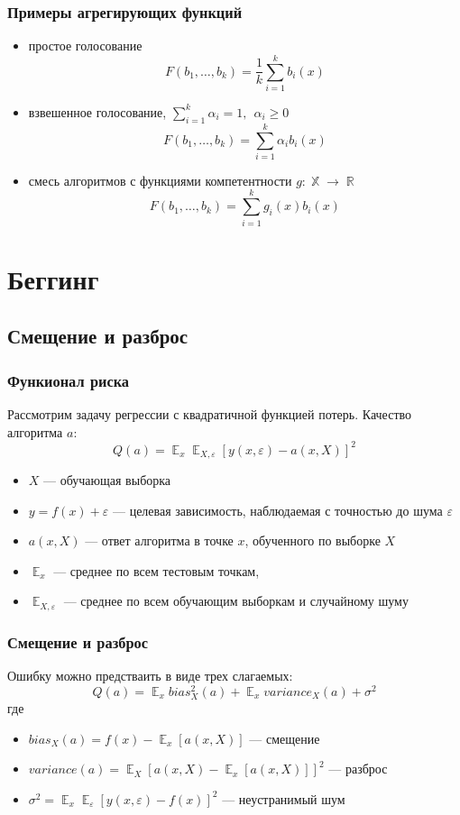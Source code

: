 \documentclass{beamer}
\newcommand{\eps}{\varepsilon}
\DeclareMathOperator{\R}{\mathbb{R}}
\DeclareMathOperator{\X}{\mathbb{X}}
\DeclareMathOperator{\E}{\mathbb{E}}
\begin{document}
	\begin{frame}
		\frametitle{Примеры агрегирующих функций}
		\begin{itemize}
			\item простое голосование
			\[
			F(b_1, \dots, b_k) = \frac{1}{k} \sum_{i=1}^{k} b_i(x)
			\]
			\item взвешенное голосование, $\sum_{i=1}^{k} \alpha_i = 1, \hspace{5pt} \alpha_i \ge 0$
			\[
				F(b_1, \dots, b_k) = \sum_{i=1}^{k} \alpha_i b_i(x)
			\]
			\item смесь алгоритмов с функциями компетентности $g : \X \rightarrow \R$
			\[
				F(b_1, \dots, b_k) = \sum_{i=1}^{k} g_i(x) b_i(x)
			\]
		\end{itemize}
	\end{frame}


	\section{Беггинг}

	\subsection{Смещение и разброс}

	\begin{frame}
		\frametitle{Функионал риска}
		Рассмотрим задачу регрессии с квадратичной функцией потерь. Качество алгоритма $a$:
		\[
		Q(a) = \E_x \E_{X, \eps} [y(x, \eps) - a(x, X)]^{2}
		\]

		\begin{itemize}
			\item $X$ --- обучающая выборка
			\item $y = f(x) + \eps$ --- целевая зависимость, наблюдаемая с точностью до шума $\eps$
			\item $a(x, X)$ --- ответ алгоритма в точке $x$, обученного по выборке $X$
			\item $\E_x$ --- среднее по всем тестовым точкам, 
			\item $\E_{X, \eps}$ --- среднее по всем обучающим выборкам и случайному шуму
		\end{itemize}
	\end{frame}

	\begin{frame}
		\frametitle{Смещение и разброс}
		
		Ошибку можно предстваить в виде трех слагаемых:
		\[
		Q(a) = \E_x bias_X^2 (a) + 
		\E_x variance_X (a)
		+ \sigma^2
		\]
		где
		\begin{itemize}
			\item $bias_X(a) = f(x) - \E_x [a(x, X)]$ --- смещение
			\item $variance(a) = \E_X [ a(x, X) - \E_x[a(x, X)] ]^2$ --- разброс
			\item $\sigma^2 = \E_x \E_{\eps} [y(x, \eps) - f(x)]^2$ --- неустранимый шум
		\end{itemize}
	\end{frame}
\end{document}
